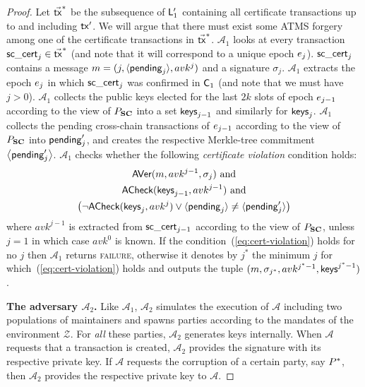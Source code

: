 \begin{proof}
  Let $\vec{\mathsf{tx}}^*$ be the subsequence of $\mathsf{L}'_1$ containing all certificate
  transactions up to and including $\mathsf{tx}'$. We will argue that there must exist
  some ATMS forgery among one of the certificate transactions in $\vec{\mathsf{tx}}^*$.
  $\mathcal{A}_1$ looks at every transaction $\mathsf{sc\_cert}_j\in\vec{\mathsf{tx}}^*$ (and note
  that it will correspond to a unique epoch $e_j$). $\mathsf{sc\_cert}_j$ contains a
  message $m = (j,\langle\mathsf{pending}_j\rangle, avk^j)$ and a signature $\sigma_j$.
  $\mathcal{A}_1$ extracts the epoch $e_j$ in
  which $\mathsf{sc\_cert}_j$ was confirmed in $\mathsf{C}_1$ (and note that we must have $j >
  0$). $\mathcal{A}_1$ collects the public keys elected for the last $2k$ slots
  of epoch $e_{j-1}$ according to the view of $P_{\mathbf{SC}}$
  into a set $\textsf{keys}_{j-1}$ and similarly for $\textsf{keys}_j$. $\mathcal{A}_1$
  collects the pending cross-chain transactions of $e_{j-1}$ according to
  the view of $P_{\mathbf{SC}}$ into $\mathsf{pending}'_j$, and creates the respective
  Merkle-tree commitment $\left\langle \mathsf{pending}'_j \right\rangle$.
  $\mathcal{A}_1$
  checks whether the following \emph{certificate violation} condition holds:
  \begin{equation}
    \label{eq:cert-violation}
    \begin{gathered}
      \textsf{AVer}(m, avk^{j-1}, \sigma_j) \text{ and}\\
      \textsf{ACheck}(\textsf{keys}_{j-1}, avk^{j-1}) \text{ and}\\
      \left(
        \lnot \textsf{ACheck}(\textsf{keys}_j, avk^j)
        \lor
        \langle\mathsf{pending}_j\rangle \neq \langle\mathsf{pending}'_j\rangle
      \right)
    \end{gathered}
  \end{equation}
  where $avk^{j-1}$ is extracted from $\mathsf{sc\_cert}_{j-1}$ according to the view of
  $P_{\mathbf{SC}}$, unless $j = 1$ in which case $avk^0$ is known.
  If the condition~(\ref{eq:cert-violation}) holds for no $j$ then
  $\mathcal{A}_1$ returns \textsc{failure}, otherwise it denotes by $j^*$ the
  minimum $j$ for which~(\ref{eq:cert-violation}) holds and outputs the tuple
  $(m, \sigma_{j^*}, avk^{j^*-1}, \textsf{keys}^{j^*-1})$.

  \bigskip
  \textbf{The adversary $\mathcal{A}_2$.}
  Like $\mathcal{A}_1$, $\mathcal{A}_2$ simulates the execution of
  $\mathcal{A}$ including two populations of maintainers and spawns parties
  according to the mandates of the environment $\mathcal{Z}$. For \emph{all}
  these parties, $\mathcal{A}_2$ generates keys internally. When $\mathcal{A}$
  requests that a transaction is created, $\mathcal{A}_2$ provides the signature
  with its respective private key. If $\mathcal{A}$ requests the corruption of a
  certain party, say $P^*$, then $\mathcal{A}_2$ provides the respective
  private key to $\mathcal{A}$.


\end{proof}
